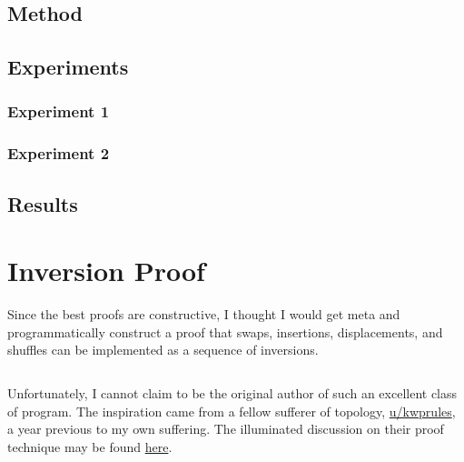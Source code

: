 \documentclass{article}
\begin{document}
\subsection{Method}

\subsection{Experiments}

\subsubsection{Experiment 1}
\subsubsection{Experiment 2}

\subsection{Results}

\appendix\appendixpage{}\addappheadtotoc{}
\section{Inversion Proof}\label{app:proof}

Since the best proofs are constructive, I thought I would get meta and programmatically construct a
proof that swaps, insertions, displacements, and shuffles can be implemented as a sequence of
inversions.

\inputminted{python}{proof.py}

Unfortunately, I cannot claim to be the original author of such an excellent class of program. The
inspiration came from a fellow sufferer of topology,
\href{https://www.reddit.com/user/kwprules}{u/kwprules}, a year previous to my own suffering. The
illuminated discussion on their proof technique may be found
\href{https://www.reddit.com/r/math/comments/7gqhlc/what\_to\_say\_instead\_of\_trivially/}{here}.


{}
\end{document}
